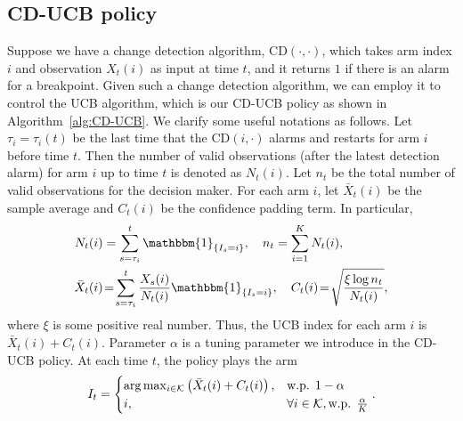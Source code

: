 \documentclass[letterpaper]{article} %
\newcommand{\magenta}{}
\begin{document}
\subsection{CD-UCB policy}
Suppose we have a change detection algorithm, CD$(\cdot,\cdot)$, which takes arm index $i$ and observation $X_t(i)$ as input at time $t$, and it returns $1$ if there is an alarm for a breakpoint. Given such a change detection algorithm, we can employ it to control the UCB algorithm, which is our CD-UCB policy as shown in Algorithm~\ref{alg:CD-UCB}. We clarify some useful notations as follows. 
{\magenta Let $\tau_i = \tau_i(t)$ be the last time that the CD$(i,\cdot)$ alarms and restarts for arm $i$ before time $t$.}
Then the number of valid observations (after the latest detection alarm) for arm $i$ up to time $t$ is denoted as $N_t(i)$. Let $n_t$ be the total number of valid observations for the decision maker. For each arm $i$, let $\bar{X}_t(i)$ be the sample average and $C_t(i)$ be the confidence padding term. In particular,
\begin{align}\label{eqn:update}
N_t(i)&=\sum_{s=\tau_i}^t\mathbbm{1}_{\{I_s=i\}},~~~n_t=\sum_{i=1}^K N_t(i),\\
\bar{X}_t(i) &\!=\! \sum_{s=\tau_i}^t\frac{X_s(i)}{N_t(i)}\mathbbm{1}_{\{I_s=i\}},~~~C_t(i) \!=\!  \sqrt{\frac{\xi\log{n_t}}{N_t(i)}},
\end{align}
where $\xi$ is some positive real number.
Thus, the UCB index for each arm $i$ is $\bar{X}_t(i)+C_t(i)$. Parameter $\alpha$ is a tuning parameter we introduce in the CD-UCB policy. At each time $t$, the policy plays the arm %
\begin{eqnarray}\label{eqn:It}
I_t=
\begin{cases}
\arg\max_{i\in\mathcal{K}}\left(\bar{X}_t(i)+C_t(i)\right),  &\text{w.p. } 1-\alpha\cr
i, & \forall i \in \mathcal{K}, \text{w.p. } \frac{\alpha}{K}
\end{cases}.
\end{eqnarray}
\end{document}

